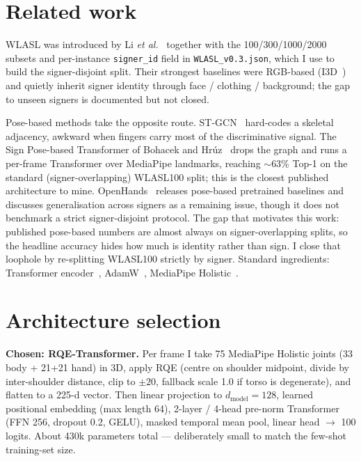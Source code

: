 \documentclass[11pt,a4paper]{article}
\begin{document}
\section{Related work}

WLASL was introduced by Li \emph{et al.}~\cite{li2020} together with the 100/300/1000/2000 subsets and per-instance \texttt{signer\_id} field in \texttt{WLASL\_v0.3.json}, which I use to build the signer-disjoint split. Their strongest baselines were RGB-based (I3D~\cite{carreira2017i3d}) and quietly inherit signer identity through face / clothing / background; the gap to unseen signers is documented but not closed.

Pose-based methods take the opposite route. ST-GCN~\cite{yan2018} hard-codes a skeletal adjacency, awkward when fingers carry most of the discriminative signal. The Sign Pose-based Transformer of Bohacek and Hr\'uz~\cite{bohacek2022sptn} drops the graph and runs a per-frame Transformer over MediaPipe landmarks, reaching $\sim$63\% Top-1 on the standard (signer-overlapping) WLASL100 split; this is the closest published architecture to mine. OpenHands~\cite{selvaraj2022openhands} releases pose-based pretrained baselines and discusses generalisation across signers as a remaining issue, though it does not benchmark a strict signer-disjoint protocol. The gap that motivates this work: published pose-based numbers are almost always on signer-overlapping splits, so the headline accuracy hides how much is identity rather than sign. I close that loophole by re-splitting WLASL100 strictly by signer. Standard ingredients: Transformer encoder~\cite{vaswani2017attention}, AdamW~\cite{loshchilov2019adamw}, MediaPipe Holistic~\cite{lugaresi2019mediapipe}.

\section{Architecture selection}
\label{sec:arch}

\textbf{Chosen: RQE-Transformer.}
Per frame I take 75 MediaPipe Holistic joints (33 body + 21+21 hand) in 3D, apply RQE (centre on shoulder midpoint, divide by inter-shoulder distance, clip to $\pm 20$, fallback scale 1.0 if torso is degenerate), and flatten to a 225-d vector. Then linear projection to $d_\text{model}=128$, learned positional embedding (max length 64), 2-layer / 4-head pre-norm Transformer (FFN 256, dropout 0.2, GELU), masked temporal mean pool, linear head $\to$ 100 logits. About 430k parameters total --- deliberately small to match the few-shot training-set size.
\end{document}
